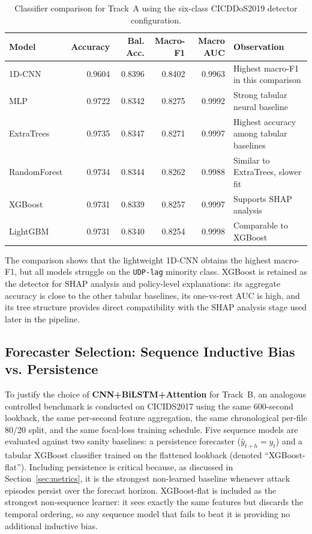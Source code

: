 \begin{table}[H]
\centering
\small
\caption{Classifier comparison for Track~A using the six-class
CICDDoS2019 detector configuration.}
\label{tab:classifier-comparison}
\begin{tabular}{@{}lrrrrl@{}}
\toprule
Model & Accuracy & Bal. Acc. & Macro-F1 & Macro AUC & Observation \\
\midrule
1D-CNN       & 0.9604 & 0.8396 & 0.8402 & 0.9963 & Highest macro-F1 in this comparison \\
MLP          & 0.9722 & 0.8342 & 0.8275 & 0.9992 & Strong tabular neural baseline \\
ExtraTrees   & 0.9735 & 0.8347 & 0.8271 & 0.9997 & Highest accuracy among tabular baselines \\
RandomForest & 0.9734 & 0.8344 & 0.8262 & 0.9988 & Similar to ExtraTrees, slower fit \\
XGBoost      & 0.9731 & 0.8339 & 0.8257 & 0.9997 & Supports SHAP analysis \\
LightGBM     & 0.9731 & 0.8340 & 0.8254 & 0.9998 & Comparable to XGBoost \\
\bottomrule
\end{tabular}
\end{table}

The comparison shows that the lightweight 1D-CNN obtains the highest macro-F1, but
all models struggle on the \texttt{UDP-lag} minority class. XGBoost is retained
as the detector for SHAP analysis and policy-level explanations:
its aggregate accuracy is close to the other tabular baselines, its one-vs-rest
AUC is high, and its tree structure provides direct compatibility with the SHAP
analysis stage used later in the pipeline.

\subsection{Forecaster Selection: Sequence Inductive Bias vs. Persistence}
\label{subsec:forecaster-comparison}

To justify the choice of \textbf{CNN+BiLSTM+Attention} for Track~B, an
analogous controlled benchmark is conducted on CICIDS2017 using the same 600-second
lookback, the same per-second feature aggregation, the same chronological per-file 80/20 split, and the same focal-loss training schedule. Five sequence models are evaluated against two sanity baselines: a persistence forecaster ($\hat{y}_{t+h}=y_t$) and a tabular XGBoost classifier trained on the flattened lookback (denoted ``XGBoost-flat''). Including persistence is critical because, as discussed in Section~\ref{sec:metrics}, it is the strongest non-learned baseline whenever attack episodes persist over the forecast horizon. XGBoost-flat is included as the strongest non-sequence learner: it sees exactly the same features but discards the temporal ordering, so any sequence model that fails to beat it is providing no additional inductive bias.

